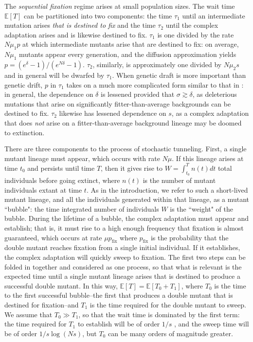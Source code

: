 \documentclass[rmp]{revtex4}
\newcommand{\pfix}{p_{\mathrm{fix}}}
\begin{document}
\begin{spacing}{1.5}
The \emph{sequential fixation} regime arises at small population sizes.
The wait time $\mathbb{E}\left[ T\right]$ can be partitioned into two components: the time $\tau_1$ until an intermediate mutation arises \emph{that is destined to fix} and the time $\tau_2$ until the complex adaptation arises and is likewise destined to fix.
$\tau_1$ is one divided by the rate $N\mu_1 p$ at which intermediate mutants arise that are destined to fix: on average, $N\mu_1$ mutants appear every generation, and the diffusion approximation yields $p = (e^\delta - 1)/(e^{N\delta} - 1)$.
$\tau_2$, similarly, is approximately one divided by $N\mu_2 s$ and in general will be dwarfed by $\tau_1$.
When genetic draft is more important than genetic drift, $p$ in $\tau_1$ takes on a much more complicated form similar to that in \citet{good_desai_2014}: in general, the dependence on $\delta$ is lessened provided that $\sigma \gtrsim \delta$, as deleterious mutations that arise on significantly fitter-than-average backgrounds can be destined to fix.
$\tau_2$ likewise has lessened dependence on $s$, as a complex adaptation that does \emph{not} arise on a fitter-than-average background lineage may be doomed to extinction.


There are three components to the process of stochastic tunneling.
First, a single mutant lineage must appear, which occurs with rate $N\mu$.
If this lineage arises at time $t_0$ and persists until time $T$, then it gives rise to $W = \int_{t_0}^T n(t) dt$ total individuals before going extinct, where $n(t)$ is the number of mutant individuals extant at time $t$.
As in the introduction, we refer to such a short-lived mutant lineage, and all the individuals generated within that lineage, as a mutant ``bubble": the time integrated number of individuals $W$ is the ``weight" of the bubble.
During the lifetime of a bubble, the complex adaptation must appear and establish; that is, it must rise to a high enough frequency that fixation is almost guaranteed, which occurs at rate $\mu \pfix$ where $\pfix$ is the probability that the double mutant reaches fixation from a single initial individual.
If it establishes, the complex adaptation will quickly sweep to fixation.
The first two steps can be folded in together and considered as one process, so that what is relevant is the expected time until a single mutant lineage arises that is destined to produce a successful double mutant.
In this way, $\mathbb{E}\left[ T \right] = \mathbb{E} \left[ T_0 + T_1 \right]$, where $T_0$ is the time to the first successful bubble--the first that produces a double mutant that is destined for fixation--and $T_1$ is the time required for the double mutant to sweep.
We assume that $T_0 \gg T_1$, so that the wait time is dominated by the first term: the time required for $T_1$ to establish will be of order $1/s$ \citep{desai_fisher_2007}, and the sweep time will be of order $1/s \log (Ns)$, but $T_0$ can be many orders of magnitude greater.


\end{spacing}
\end{document}
